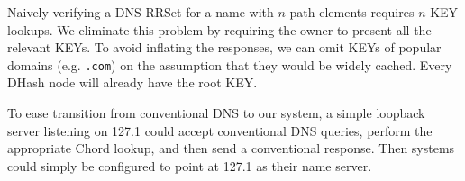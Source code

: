 Naively verifying a DNS RRSet for a name with $n$ 
path elements requires $n$ KEY lookups.
We eliminate this problem by requiring the owner to
present all the relevant KEYs. To avoid inflating 
the responses, we can omit KEYs of popular domains
(e.g. {\tt .com}) on the assumption that they would be 
widely cached. Every DHash node will already have the
root KEY.

To ease transition from conventional DNS to our system,
a simple loopback server listening on 127.1 could accept
conventional DNS queries, perform the appropriate Chord lookup,
and then send a conventional response.
Then systems could simply be configured to 
point at 127.1 as their name server.


